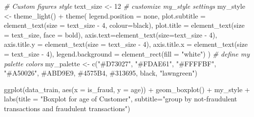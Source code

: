 \documentclass[
]{report}
\newenvironment{Shaded}{\begin{snugshade}}{\end{snugshade}}
\newcommand{\AttributeTok}[1]{\textcolor[rgb]{0.77,0.63,0.00}{#1}}
\newcommand{\CommentTok}[1]{\textcolor[rgb]{0.56,0.35,0.01}{\textit{#1}}}
\newcommand{\DecValTok}[1]{\textcolor[rgb]{0.00,0.00,0.81}{#1}}
\newcommand{\FunctionTok}[1]{\textcolor[rgb]{0.00,0.00,0.00}{#1}}
\newcommand{\NormalTok}[1]{#1}
\newcommand{\OtherTok}[1]{\textcolor[rgb]{0.56,0.35,0.01}{#1}}
\newcommand{\SpecialCharTok}[1]{\textcolor[rgb]{0.00,0.00,0.00}{#1}}
\newcommand{\StringTok}[1]{\textcolor[rgb]{0.31,0.60,0.02}{#1}}
\begin{document}
\begin{Shaded}
\begin{Highlighting}[]
\CommentTok{\# Custom figures style }
\NormalTok{text\_size }\OtherTok{\textless{}{-}} \DecValTok{12}
\CommentTok{\# customize my\_style settings}
\NormalTok{my\_style }\OtherTok{\textless{}{-}}  \FunctionTok{theme\_light}\NormalTok{() }\SpecialCharTok{+} 
  \FunctionTok{theme}\NormalTok{(}
    \AttributeTok{legend.position =} \StringTok{\textquotesingle{}none\textquotesingle{}}\NormalTok{,}
    \AttributeTok{plot.subtitle =} \FunctionTok{element\_text}\NormalTok{(}\AttributeTok{size =}\NormalTok{ text\_size }\SpecialCharTok{{-}} \DecValTok{4}\NormalTok{, }\AttributeTok{colour=}\StringTok{\textquotesingle{}black\textquotesingle{}}\NormalTok{),}
    \AttributeTok{plot.title =} \FunctionTok{element\_text}\NormalTok{(}\AttributeTok{size =}\NormalTok{ text\_size, }\AttributeTok{face =} \StringTok{\textquotesingle{}bold\textquotesingle{}}\NormalTok{),}
    \AttributeTok{axis.text=}\FunctionTok{element\_text}\NormalTok{(}\AttributeTok{size=}\NormalTok{text\_size }\SpecialCharTok{{-}} \DecValTok{4}\NormalTok{), }
    \AttributeTok{axis.title.y =} \FunctionTok{element\_text}\NormalTok{(}\AttributeTok{size =}\NormalTok{ text\_size }\SpecialCharTok{{-}} \DecValTok{4}\NormalTok{), }
    \AttributeTok{axis.title.x =} \FunctionTok{element\_text}\NormalTok{(}\AttributeTok{size =}\NormalTok{ text\_size }\SpecialCharTok{{-}} \DecValTok{4}\NormalTok{),}
    \AttributeTok{legend.background =} \FunctionTok{element\_rect}\NormalTok{(}\AttributeTok{fill =} \StringTok{"white"}\NormalTok{)}
\NormalTok{  ) }
\CommentTok{\# define my palette colors}
\NormalTok{my\_palette }\OtherTok{\textless{}{-}} \FunctionTok{c}\NormalTok{(}\StringTok{"\#D73027"}\NormalTok{, }\StringTok{"\#FDAE61"}\NormalTok{, }\StringTok{"\#FFFFBF"}\NormalTok{, }
                         \StringTok{"\#A50026"}\NormalTok{, }\StringTok{\textquotesingle{}\#ABD9E9\textquotesingle{}}\NormalTok{, }\StringTok{\textquotesingle{}\#4575B4\textquotesingle{}}\NormalTok{, }
                         \StringTok{\textquotesingle{}\#313695\textquotesingle{}}\NormalTok{, }\StringTok{\textquotesingle{}black\textquotesingle{}}\NormalTok{, }\StringTok{"lawngreen"}\NormalTok{)}
\end{Highlighting}
\end{Shaded}

\begin{Shaded}
\begin{Highlighting}[]
\FunctionTok{ggplot}\NormalTok{(data\_train, }\FunctionTok{aes}\NormalTok{(}\AttributeTok{x =}\NormalTok{ is\_fraud, }\AttributeTok{y =}\NormalTok{ age)) }\SpecialCharTok{+}
  \FunctionTok{geom\_boxplot}\NormalTok{() }\SpecialCharTok{+}
\NormalTok{  my\_style }\SpecialCharTok{+}
  \FunctionTok{labs}\NormalTok{(}\AttributeTok{title =} \StringTok{"Boxplot for age of Customer"}\NormalTok{,}
       \AttributeTok{subtitle=}\StringTok{"group by not{-}fraudulent transactions and fraudulent transactions"}\NormalTok{)}
\end{Highlighting}
\end{Shaded}
\end{document}
